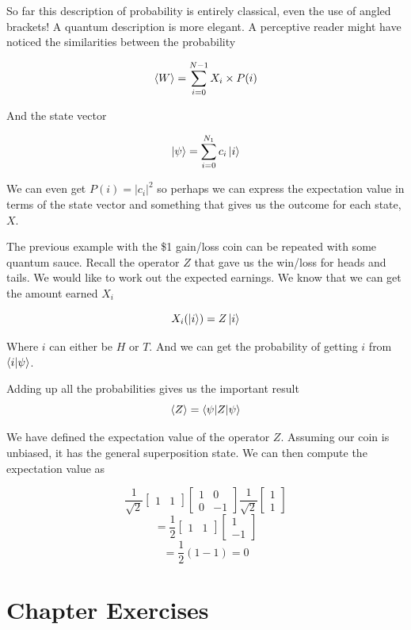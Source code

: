 So far this description of probability is entirely classical, even the use of angled brackets! A quantum description is more elegant. A perceptive reader might have noticed the similarities between the probability

$$ \braket{W} = \sum_{i = 0}^{N-1} X_i \times P(i) $$

And the state vector

$$
\ket{\psi} = \sum_{i = 0}^{N_1} c_i \ket{i}
$$ 

We can even get $P(i) = |c_i|^2$ so perhaps we can express the expectation value in terms of the state vector and something that gives us the outcome for each state,$X$. 

The previous example with the \$1 gain/loss coin can be repeated with some quantum sauce. Recall the operator $Z$ that gave us the win/loss for heads and tails. We would like to work out the expected earnings. We know that we can get the amount earned $X_i$

$$ X_i (\ket{i}) = Z\ket{i}$$

Where $i$ can either be $H$ or $T$. 
And we can get the probability of getting $i$ from $\braket{i|\psi}$.

Adding up all the probabilities gives us the important result
$$
\braket{Z} = \braket{\psi|Z|\psi}
$$

We have defined the expectation value of the operator $Z$. Assuming our coin is unbiased, it has the general superposition state. We can then compute the expectation value as

$$
\frac{1}{\sqrt{2}} \begin{bmatrix} 1 & 1 \end{bmatrix} \begin{bmatrix} 1 & 0 \\ 0 & -1 \end{bmatrix} \frac{1}{\sqrt{2}} \begin{bmatrix} 1 \\ 1 \end{bmatrix}
$$
$$
= \frac{1}{2}\begin{bmatrix} 1 & 1 \end{bmatrix} \begin{bmatrix} 1 \\ -1 \end{bmatrix}
$$
$$ = \frac{1}{2} ( 1 - 1) = 0 $$ 

\section{Chapter Exercises}

